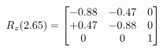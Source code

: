 \documentclass[preview]{standalone}
\begin{document}
\begin{align*}
\special{dvisvgm:raw <g id='unique000'>}R_{z}(2.65) = \begin{bmatrix}-0.88 & -0.47 & 0 \\+0.47 & -0.88 & 0 \\0 & 0 & 1\end{bmatrix}\special{dvisvgm:raw </g>}
\end{align*}
\end{document}
